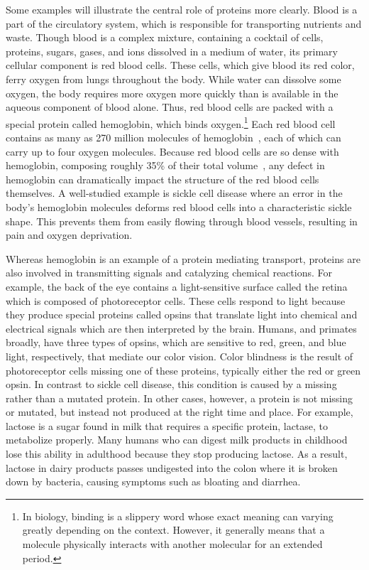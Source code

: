Some examples will illustrate the central role of proteins more clearly. Blood is a part of the circulatory system, which is responsible for transporting nutrients and waste. Though blood is a complex mixture, containing a cocktail of cells, proteins, sugars, gases, and ions dissolved in a medium of water, its primary cellular component is red blood cells. These cells, which give blood its red color, ferry oxygen from lungs throughout the body. While water can dissolve some oxygen, the body requires more oxygen more quickly than is available in the aqueous component of blood alone. Thus, red blood cells are packed with a special protein called hemoglobin, which binds oxygen.\footnote{In biology, binding is a slippery word whose exact meaning can varying greatly depending on the context. However, it generally means that a molecule physically interacts with another molecular for an extended period.} Each red blood cell contains as many as 270 million molecules of hemoglobin~\cite{Pierig2008}, each of which can carry up to four oxygen molecules. Because red blood cells are so dense with hemoglobin, composing roughly 35\% of their total volume~\cite{Kanias2009}, any defect in hemoglobin can dramatically impact the structure of the red blood cells themselves. A well-studied example is sickle cell disease where an error in the body's hemoglobin molecules deforms red blood cells into a characteristic sickle shape. This prevents them from easily flowing through blood vessels, resulting in pain and oxygen deprivation.

Whereas hemoglobin is an example of a protein mediating transport, proteins are also involved in transmitting signals and catalyzing chemical reactions. For example, the back of the eye contains a light-sensitive surface called the retina which is composed of photoreceptor cells. These cells respond to light because they produce special proteins called opsins that translate light into chemical and electrical signals which are then interpreted by the brain. Humans, and primates broadly, have three types of opsins, which are sensitive to red, green, and blue light, respectively, that mediate our color vision. Color blindness is the result of photoreceptor cells missing one of these proteins, typically either the red or green opsin. In contrast to sickle cell disease, this condition is caused by a missing rather than a mutated protein. In other cases, however, a protein is not missing or mutated, but instead not produced at the right time and place. For example, lactose is a sugar found in milk that requires a specific protein, lactase, to metabolize properly. Many humans who can digest milk products in childhood lose this ability in adulthood because they stop producing lactose. As a result, lactose in dairy products passes undigested into the colon where it is broken down by bacteria, causing symptoms such as bloating and diarrhea.


